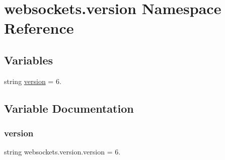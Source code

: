 \hypertarget{namespacewebsockets_1_1version}{}\section{websockets.\+version Namespace Reference}
\label{namespacewebsockets_1_1version}
\subsection*{Variables}
\begin{DoxyCompactItemize}
\item 
string \hyperlink{namespacewebsockets_1_1version_a4c734b911544c7593370133c75ce4d0b}{version} = \textquotesingle{}6.\textquotesingle{}
\end{DoxyCompactItemize}


\subsection{Variable Documentation}
\mbox{\label{namespacewebsockets_1_1version_a4c734b911544c7593370133c75ce4d0b}} 
\subsubsection{\texorpdfstring{version}{version}}
{\footnotesize\ttfamily string websockets.\+version.\+version = \textquotesingle{}6.\textquotesingle{}}

